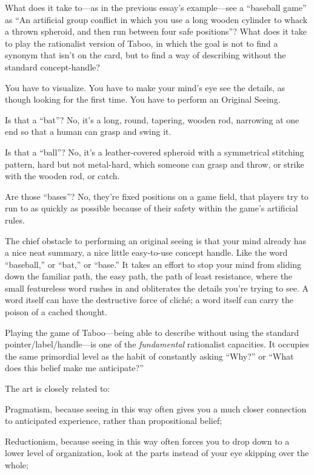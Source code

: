 
{
 What does it take to---as in the previous essay's
example---see a ``baseball game'' as
``An artificial group conflict in which you use a long
wooden cylinder to whack a thrown spheroid, and then run between four
safe positions''? What does it take to play the
rationalist version of Taboo, in which the goal is not to find a
synonym that isn't on the card, but to find a way of
describing without the standard concept-handle? }

{
 You have to visualize. You have to make your
mind's eye see the details, as though looking for the
first time. You have to perform an Original Seeing.}

{
 Is that a ``bat''? No,
it's a long, round, tapering, wooden rod, narrowing at
one end so that a human can grasp and swing it.}

{
 Is that a ``ball''? No,
it's a leather-covered spheroid with a symmetrical
stitching pattern, hard but not metal-hard, which someone can grasp and
throw, or strike with the wooden rod, or catch.}

{
 Are those ``bases''? No,
they're fixed positions on a game field, that players
try to run to as quickly as possible because of their safety within the
game's artificial rules.}

{
 The chief obstacle to performing an original seeing is that your
mind already has a nice neat summary, a nice little easy-to-use concept
handle. Like the word ``baseball,''
or ``bat,'' or
``base.'' It takes an effort to stop
your mind from sliding down the familiar path, the easy path, the path
of least resistance, where the small featureless word rushes in and
obliterates the details you're trying to see. A word
itself can have the destructive force of cliché; a word itself can
carry the poison of a cached thought.}

{
 Playing the game of Taboo---being able to describe without using
the standard pointer/label/handle---is one of the \textit{fundamental}
rationalist capacities. It occupies the same primordial level as the
habit of constantly asking ``Why?''
or ``What does this belief make me
anticipate?''}

{
 The art is closely related to:}

{
 Pragmatism, because seeing in this way often gives you a much
closer connection to anticipated experience, rather than propositional
belief;}

{
 Reductionism, because seeing in this way often forces you to drop
down to a lower level of organization, look at the parts instead of
your eye skipping over the whole;}

